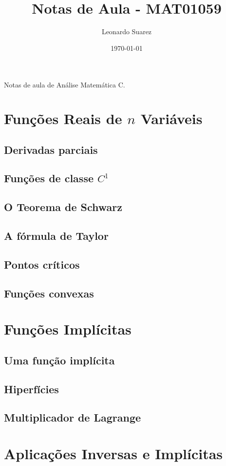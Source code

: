 \documentclass{article}
\title{Notas de Aula - MAT01059}
\author{Leonardo Suarez}
\date{\today}
\begin{document}
\maketitle

Notas de aula de Análise Matemática C.

\tableofcontents

\section{Funções Reais de \(n\) Variáveis}
\subsection{Derivadas parciais}
\subsection{Funções de classe \(C^1\)}
\subsection{O Teorema de Schwarz}
\subsection{A fórmula de Taylor}
\subsection{Pontos críticos}
\subsection{Funções convexas}

\section{Funções Implícitas}
\subsection{Uma função implícita}
\subsection{Hiperfícies}
\subsection{Multiplicador de Lagrange}

\section{Aplicações Inversas e Implícitas}
\end{document}
